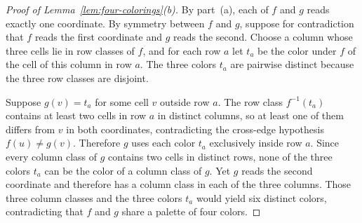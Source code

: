 \begin{proof}[Proof of Lemma~\ref{lem:four-colorings}\textup{(b)}]
By part~(a), each of $f$ and $g$ reads exactly one coordinate. By symmetry between $f$ and $g$, suppose for contradiction that $f$ reads the first coordinate and $g$ reads the second. Choose a column whose three cells lie in row classes of $f$, and for each row $a$ let $t_a$ be the color under $f$ of the cell of this column in row $a$. The three colors $t_a$ are pairwise distinct because the three row classes are disjoint.

Suppose $g(v)=t_a$ for some cell $v$ outside row $a$. The row class $f^{-1}(t_a)$ contains at least two cells in row $a$ in distinct columns, so at least one of them differs from $v$ in both coordinates, contradicting the cross-edge hypothesis $f(u)\ne g(v)$. Therefore $g$ uses each color $t_a$ exclusively inside row $a$. Since every column class of $g$ contains two cells in distinct rows, none of the three colors $t_a$ can be the color of a column class of $g$. Yet $g$ reads the second coordinate and therefore has a column class in each of the three columns. Those three column classes and the three colors $t_a$ would yield six distinct colors, contradicting that $f$ and $g$ share a palette of four colors.
\end{proof}

